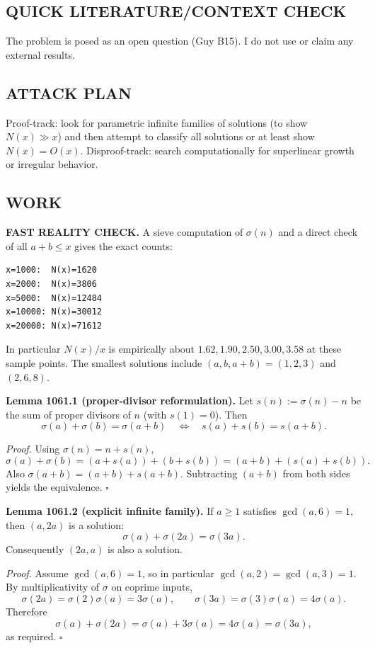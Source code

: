 \subsection*{QUICK LITERATURE/CONTEXT CHECK}
The problem is posed as an open question (Guy B15). I do not use or claim any external results.

\subsection*{ATTACK PLAN}
Proof-track: look for parametric infinite families of solutions (to show $N(x)\gg x$) and then attempt to classify all solutions or at least show $N(x)=O(x)$.
Disproof-track: search computationally for superlinear growth or irregular behavior.

\subsection*{WORK}
\textbf{FAST REALITY CHECK.}
A sieve computation of $\sigma(n)$ and a direct check of all $a+b\le x$ gives the exact counts:
\begin{verbatim}
x=1000:  N(x)=1620
x=2000:  N(x)=3806
x=5000:  N(x)=12484
x=10000: N(x)=30012
x=20000: N(x)=71612
\end{verbatim}
In particular $N(x)/x$ is empirically about $1.62,1.90,2.50,3.00,3.58$ at these sample points.
The smallest solutions include $(a,b,a+b)=(1,2,3)$ and $(2,6,8)$.

\medskip
\textbf{Lemma 1061.1 (proper-divisor reformulation).}
Let $s(n):=\sigma(n)-n$ be the sum of proper divisors of $n$ (with $s(1)=0$). Then
\[
\sigma(a)+\sigma(b)=\sigma(a+b)\quad\Longleftrightarrow\quad s(a)+s(b)=s(a+b).
\]

\emph{Proof.}
Using $\sigma(n)=n+s(n)$,
\[
\sigma(a)+\sigma(b)= (a+s(a))+(b+s(b)) = (a+b) + (s(a)+s(b)).
\]
Also $\sigma(a+b)=(a+b)+s(a+b)$. Subtracting $(a+b)$ from both sides yields the equivalence. \hfill$\square$

\medskip
\textbf{Lemma 1061.2 (explicit infinite family).}
If $a\ge 1$ satisfies $\gcd(a,6)=1$, then $(a,2a)$ is a solution:
\[
\sigma(a)+\sigma(2a)=\sigma(3a).
\]
Consequently $(2a,a)$ is also a solution.

\emph{Proof.}
Assume $\gcd(a,6)=1$, so in particular $\gcd(a,2)=\gcd(a,3)=1$. By multiplicativity of $\sigma$ on coprime inputs,
\[
\sigma(2a)=\sigma(2)\sigma(a)=3\sigma(a),\qquad \sigma(3a)=\sigma(3)\sigma(a)=4\sigma(a).
\]
Therefore
\[
\sigma(a)+\sigma(2a)=\sigma(a)+3\sigma(a)=4\sigma(a)=\sigma(3a),
\]
as required. \hfill$\square$

